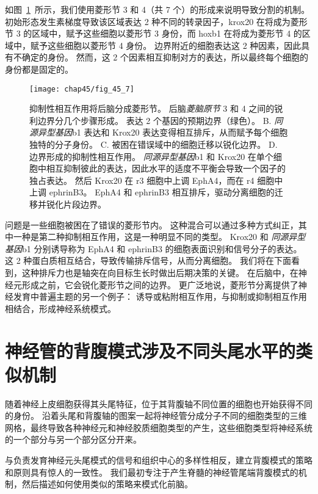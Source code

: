 如图~\ref{fig:45_7}~所示，我们使用菱形节 3 和 4（共 7 个）的形成来说明导致分割的机制。
初始形态发生素梯度导致该区域表达 2 种不同的转录因子，krox20 在将成为菱形节 3 的区域中，赋予这些细胞以菱形节 3 身份，而 hoxb1 在将成为菱形节 4 的区域中，赋予这些细胞以菱形节 4 身份。
边界附近的细胞表达这 2 种因素，因此具有不确定的身份。
然而，这 2 个因素相互抑制对方的表达，所以最终每个细胞的身份都是固定的。


\begin{figure}[htbp]
	\centering
	\texttt{[image: chap45/fig\_45\_7]}
	\caption{抑制性相互作用将后脑分成菱形节。
		后脑\textit{菱脑原节} 3 和 4 之间的锐利边界分几个步骤形成\cite{addison2016segment}。
		表达 2 个基因的预期边界（绿色）。
		B. \textit{同源异型基因}b1 表达和 Krox20 表达变得相互排斥，从而赋予每个细胞独特的分子身份。
		C. 被困在错误域中的细胞迁移以锐化边界。
		D. 边界形成的抑制性相互作用。
		\textit{同源异型基因}b1 和 Krox20 在单个细胞中相互抑制彼此的表达，因此水平的适度不平衡会导致一个因子的独占表达。
		然后 Krox20 在 r3 细胞中上调 EphA4，而在 r4 细胞中上调 ephrinB3。
		EphA4 和 ephrinB3 相互排斥，驱动分离细胞的迁移并锐化片段边界。}
	\label{fig:45_7}
\end{figure}


问题是一些细胞被困在了错误的菱形节内。
这种混合可以通过多种方式纠正，其中一种是第二种抑制相互作用，这是一种明显不同的类型。
Krox20 和 \textit{同源异型基因}b1 分别诱导称为 EphA4 和 ephrinB3 的细胞表面识别和信号分子的表达。
这 2 种蛋白质相互结合，导致传输排斥信号，从而分离细胞。
我们将在下面看到，这种排斥力也是轴突在向目标生长时做出后期决策的关键。
在后脑中，在神经元形成之前，它会锐化菱形节之间的边界。
更广泛地说，菱形节分离提供了神经发育中普遍主题的另一个例子：
诱导或粘附相互作用，与抑制或抑制相互作用相结合，形成神经系统模式。




\section{神经管的背腹模式涉及不同头尾水平的类似机制}

随着神经上皮细胞获得其头尾特征，位于其背腹轴不同位置的细胞也开始获得不同的身份。
沿着头尾和背腹轴的图案一起将神经管分成分子不同的细胞类型的三维网格，最终导致各种神经元和神经胶质细胞类型的产生，这些细胞类型将神经系统的一个部分与另一个部分区分开来。


与负责发育神经元头尾模式的信号和组织中心的多样性相反，建立背腹模式的策略和原则具有惊人的一致性。
我们最初专注于产生脊髓的神经管尾端背腹模式的机制，然后描述如何使用类似的策略来模式化前脑。


